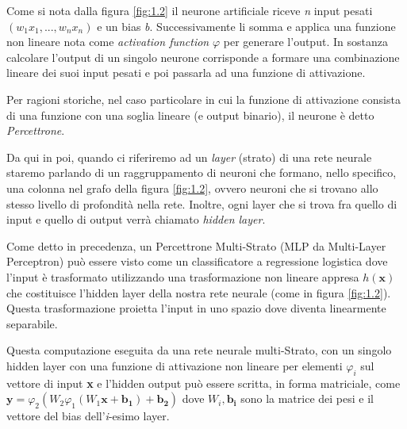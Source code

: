 Come si nota dalla figura \ref{fig:1.2} il neurone artificiale riceve \emph{n} input pesati $(w_1x_1,...,w_nx_n)$ e un bias \emph{b}. Successivamente li somma e applica una funzione non lineare nota come \textit{activation function} $\varphi$ per generare l'output. In sostanza calcolare l'output di un singolo neurone corrisponde a formare una combinazione lineare dei suoi input pesati e poi passarla ad una funzione di attivazione.

Per ragioni storiche, nel caso particolare in cui la funzione di attivazione consista di una funzione con una soglia lineare (e output binario), il neurone è detto \textit{Percettrone}.

Da qui in poi, quando ci riferiremo ad un \textit{layer} (strato) di una rete neurale staremo parlando di un raggruppamento di neuroni che formano, nello specifico, una colonna nel grafo della figura \ref{fig:1.2}, ovvero neuroni che si trovano allo stesso livello di profondità nella rete. Inoltre, ogni layer che si trova fra quello di input e quello di output verrà chiamato \textit{hidden layer}.

Come detto in precedenza, un Percettrone Multi-Strato (MLP da Multi-Layer Perceptron) può essere visto come un classificatore a regressione logistica dove l'input è trasformato utilizzando una trasformazione non lineare appresa $h(\boldsymbol{x})$ che costituisce l'hidden layer della nostra rete neurale (come in figura \ref{fig:1.2}). Questa trasformazione proietta l'input in uno spazio dove diventa linearmente separabile.

Questa computazione eseguita da una rete neurale multi-Strato, con un singolo hidden layer con una funzione di attivazione non lineare per elementi $\varphi_i$ sul vettore di input \textbf{x} e l'hidden output può essere scritta, in forma matriciale, come $\boldsymbol{y} = \varphi_2(W_2\varphi_1(W_1\boldsymbol{x} + \boldsymbol{b_1}) + \boldsymbol{b_2})$ dove $W_i, \boldsymbol{b_i}$ sono la matrice dei pesi e il vettore del bias dell'\textit{i}-esimo layer.

